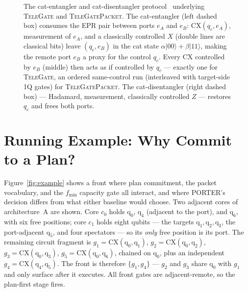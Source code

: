 \documentclass[journal]{IEEEtran}
\newcommand{\PORTER}{\textsc{PORTER}}
\newcommand{\TeleGate}{\textsc{TeleGate}}
\newcommand{\TeleGatePacket}{\textsc{TeleGatePacket}}
\newcommand{\logi}[1]{\mathrm{q}_{#1}}
\begin{document}
\begin{figure}[t]
\caption{The cat-entangler and cat-disentangler
  protocol~\cite{yimsiriwattana2004generalized} underlying
  \TeleGate{} and \TeleGatePacket{}. The cat-entangler (left dashed
  box) consumes the EPR pair between ports $e_A$ and $e_B$:
  $\mathrm{CX}(q_c,e_A)$, measurement of $e_A$, and a classically
  controlled $X$ (double lines are classical bits) leave $(q_c,e_B)$
  in the cat state $\alpha|00\rangle+\beta|11\rangle$, making the
  remote port $e_B$ a proxy for the control $q_c$. Every CX
  controlled by $e_B$ (middle) then acts as if controlled by $q_c$
  --- exactly one for \TeleGate{}, an ordered same-control run
  (interleaved with target-side 1Q gates) for \TeleGatePacket{}. The
  cat-disentangler (right dashed box) --- Hadamard, measurement,
  classically controlled $Z$ --- restores $q_c$ and frees both
  ports.}
\label{fig:catent-app}
\end{figure}

\section{Running Example: Why Commit to a Plan?}
\label{sec:sfc-example}

Figure~\ref{fig:example} shows a front where plan commitment, the
packet vocabulary, and the $f_\mathrm{min}$ capacity gate all
interact, and where \PORTER{}'s decision differs from what either
baseline would choose. Two adjacent cores of architecture~A are shown. Core $c_0$
holds $\logi{0}$, $\logi{4}$ (adjacent to the port), and $\logi{6}$,
with six free positions; core $c_1$ holds eight qubits --- the targets
$\logi{1},\logi{2},\logi{3}$, the port-adjacent $\logi{5}$, and four
spectators --- so its \emph{only} free position is its port. The
remaining circuit fragment is
$g_1{=}\mathrm{CX}(\logi{0},\logi{1})$,
$g_2{=}\mathrm{CX}(\logi{0},\logi{2})$,
$g_3{=}\mathrm{CX}(\logi{0},\logi{3})$,
$g_5{=}\mathrm{CX}(\logi{0},\logi{6})$, chained on $\logi{0}$, plus an
independent $g_4{=}\mathrm{CX}(\logi{4},\logi{5})$. The front is
therefore $\{g_1, g_4\}$ --- $g_2$ and $g_3$ share $\logi{0}$ with
$g_1$ and only surface after it executes. All front gates are
adjacent-remote, so the plan-first stage fires.
\end{document}
